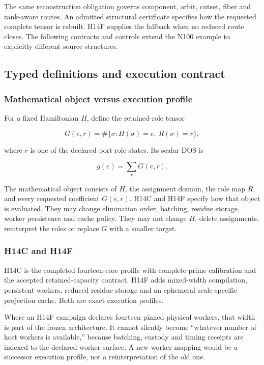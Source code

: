 The same reconstruction obligation governs component, orbit, cutset, fiber and rank-aware routes. An admitted structural certificate specifies how the requested complete tensor is rebuilt. H14F supplies the fallback when no reduced route closes. The following contracts and controls extend the N100 example to explicitly different source structures.

\subsection{Typed definitions and execution
contract}\label{viii-ch01-typed-definitions-and-execution-contract}

\subsubsection{Mathematical object versus execution
profile}\label{viii-ch01-mathematical-object-versus-execution-profile}

For a fixed Hamiltonian \(H\), define the retained-role tensor

\[
G(e,r)=\#\{\sigma:H(\sigma)=e,\ R(\sigma)=r\},
\]

where \(r\) is one of the declared port-role states. Its scalar DOS is

\[
g(e)=\sum_rG(e,r).
\]

The mathematical object consists of \(H\), the assignment domain, the
role map \(R\), and every requested coefficient \(G(e,r)\). H14C and
H14F specify how that object is evaluated. They may change elimination
order, batching, residue storage, worker persistence and cache policy.
They may not change \(H\), delete assignments, reinterpret the roles or
replace \(G\) with a smaller target.

\subsubsection{H14C and H14F}\label{viii-ch01-h14c-and-h14f}

H14C is the completed fourteen-core profile with complete-prime
calibration and the accepted retained-capacity contract. H14F adds
mixed-width compilation, persistent workers, reduced residue storage and
an ephemeral scale-specific projection cache. Both are exact execution
profiles.

Where an H14F campaign declares fourteen pinned physical workers, that
width is part of the frozen architecture. It cannot silently become
``whatever number of host workers is available,'' because batching,
custody and timing receipts are indexed to the declared worker surface.
A new worker mapping would be a successor execution profile, not a
reinterpretation of the old one.


